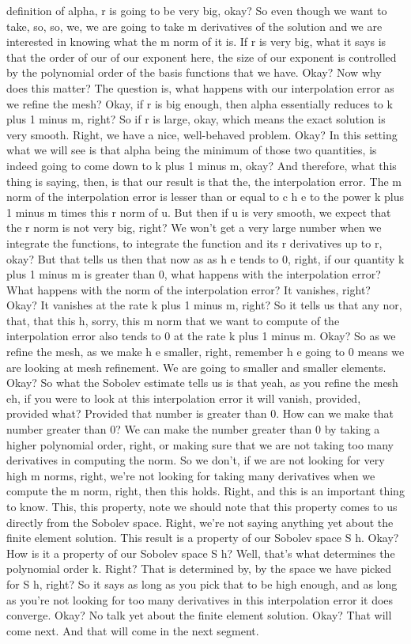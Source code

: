 \documentclass[10pt]{article}
\begin{document}
{definition of alpha, r is going to be very big, okay? So even though we want to take, so, so, we, we are going to take m derivatives of the solution and we are interested in knowing what the m norm of it is. If r is very big, what it says is that the order of our of our exponent here, the size of our exponent is controlled by the polynomial order of the basis functions that we have. Okay? Now why does this matter? The question is, what happens with our interpolation error as we refine the mesh? Okay, if r is big enough, then alpha essentially reduces to k plus 1 minus m, right? So if r is large, okay, which means the exact solution is very smooth. Right, we have a nice, well-behaved problem. Okay? In this setting what we will see is that alpha being the minimum of those two quantities, is indeed going to come down to k plus 1 minus m, okay? And therefore, what this thing is saying, then, is that our result is that the, the interpolation error. The m norm of the interpolation error is lesser than or equal to c h e to the power k plus 1 minus m times this r norm of u. But then if u is very smooth, we expect that the r norm is not very big, right? We won't get a very large number when we integrate the functions, to integrate the function and its r derivatives up to r, okay? But that tells us then that now as as h e tends to 0, right, if our quantity k plus 1 minus m is greater than 0, what happens with the interpolation error? What happens with the norm of the interpolation error? It vanishes, right? Okay? It vanishes at the rate k plus 1 minus m, right? So it tells us that any nor, that, that this h, sorry, this m norm that we want to compute of the interpolation error also tends to 0 at the rate k plus 1 minus m. Okay? So as we refine the mesh, as we make h e smaller, right, remember h e going to 0 means we are looking at mesh refinement. We are going to smaller and smaller elements. Okay? So what the Sobolev estimate tells us is that yeah, as you refine the mesh eh, if you were to look at this interpolation error it will vanish, provided, provided what? Provided that number is greater than 0. How can we make that number greater than 0? We can make the number greater than 0 by taking a higher polynomial order, right, or making sure that we are not taking too many derivatives in computing the norm. So we don't, if we are not looking for very high m norms, right, we're not looking for taking many derivatives when we compute the m norm, right, then this holds. Right, and this is an important thing to know. This, this property, note we should note that this property comes to us directly from the Sobolev space. Right, we're not saying anything yet about the finite element solution. This result is a property of our Sobolev space S h. Okay? How is it a property of our Sobolev space S h? Well, that's what determines the polynomial order k. Right? That is determined by, by the space we have picked for S h, right? So it says as long as you pick that to be high enough, and as long as you're not looking for too many derivatives in this interpolation error it does converge. Okay? No talk yet about the finite element solution. Okay? That will come next. And that will come in the next segment.

}
\end{document}
